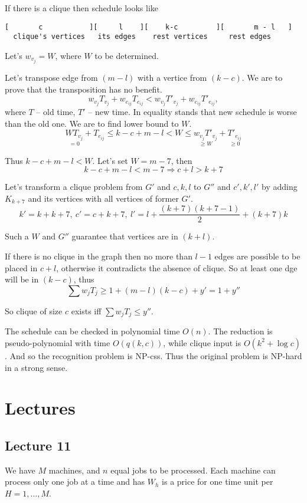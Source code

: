 \documentclass{amsart}
\begin{document}
If there is a clique then schedule looks like
\begin{verbatim}
[       c           ][     l    ][    k-c         ][       m - l   ]
  clique's vertices   its edges    rest vertices     rest edges
\end{verbatim}

Let's $w_{v_j}=W$, where $W$ to be determined.

Let's transpose edge from $(m-l)$ with a vertice from $(k-c)$.
We are to prove that the transposition has no benefit.
\[
  w_{v_j}T_{v_j} + w_{e_{ij}}T_{e_{ij}} <
    w_{v_j}T'_{v_j} + w_{e_{ij}}T'_{e_{ij}},
\]
where $T$ -- old time, $T'$ -- new time. In equality stands that
new schedule is worse than the old one. We are to find lower bound to $W$.
\[
  \underset{=0}
    {WT_{v_j}} +
  T_{e_{ij}} \leqslant k - c + m - l <
    W \leqslant
      \underset{\geqslant W}
        { w_{v_j} T'_{v_j} } +
      \underset{\geqslant 0}
        { T'_{e_{ij}} }
\]

Thus $k-c+m-l < W$. Let's set $W=m-7$, then
\[
  k - c + m - l < m - 7 \Rightarrow c + l > k + 7
\]

Let's transform a clique problem from $G'$ and $c,k,l$ to
$G''$ and $c',k',l'$ by adding $K_{k+7}$ and its vertices with
all vertices of former $G'$.
\[
  k' = k + k + 7,\ c' = c + k + 7,
  \ l' = l + \frac{(k+7)(k+7-1)}{2} + (k+7)k
\]

Such a $W$ and $G''$ guarantee that vertices are in $(k+l)$.

If there is no clique in the graph then no more than $l-1$ edges
are possible to be placed in $c+l$, otherwise it contradicts the absence
of clique. So at least one dge will be in $(k-c)$, thus
\[
  \sum w_jT_j \geqslant 1 + (m-l)(k-c) + y' = 1 + y''
\]

So clique of size $c$ exists iff $\sum w_jT_j \leqslant y''$.

The schedule can be checked in polynomial time $O(n)$.
The reduction is pseudo-polynomial with time $O(q(k,c))$, while
clique input is $O(k^2+ \log c)$. And so the recognition problem is NP-css.
Thus the original problem is NP-hard in a strong sense.

\section{Lectures}

\subsection{Lecture 11}
We have $M$ machines, and $n$ equal jobs to be processed.
Each machine can process only one job at a time and has $W_h$ is a price
for one time unit per $H=1,\dots,M$.
\end{document}
